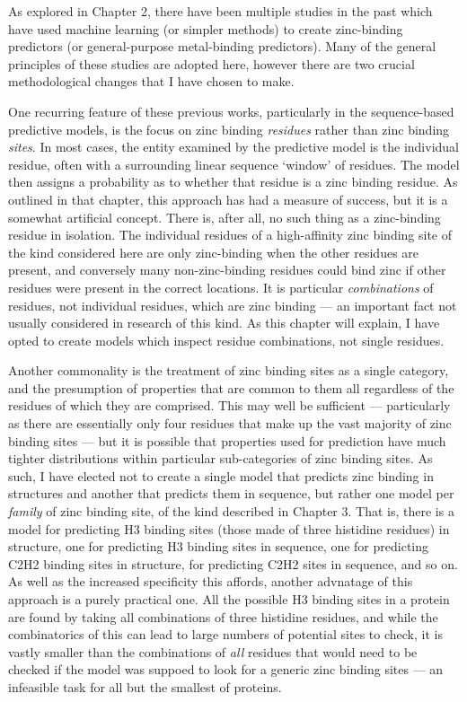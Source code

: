 As explored in Chapter 2, there have been multiple studies in the past which have used machine learning (or simpler methods) to create zinc-binding predictors (or general-purpose metal-binding predictors). Many of the general principles of these studies are adopted here, however there are two crucial methodological changes that I have chosen to make.

One recurring feature of these previous works, particularly in the sequence-based predictive models, is the focus on zinc binding \emph{residues} rather than zinc binding \emph{sites}. In most cases, the entity examined by the predictive model is the individual residue, often with a surrounding linear sequence `window' of residues. The model then assigns a probability as to whether that residue is a zinc binding residue. As outlined in that chapter, this approach has had a measure of success, but it is a somewhat artificial concept. There is, after all, no such thing as a zinc-binding residue in isolation. The individual residues of a high-affinity zinc binding site of the kind considered here are only zinc-binding when the other residues are present, and conversely many non-zinc-binding residues could bind zinc if other residues were present in the correct locations. It is particular \emph{combinations} of residues, not individual residues, which are zinc binding --- an important fact not usually considered in research of this kind. As this chapter will explain, I have opted to create models which inspect residue combinations, not single residues.

Another commonality is the treatment of zinc binding sites as a single category, and the presumption of properties that are common to them all regardless of the residues of which they are comprised. This may well be sufficient --- particularly as there are essentially only four residues that make up the vast majority of zinc binding sites --- but it is possible that properties used for prediction have much tighter distributions within particular sub-categories of zinc binding sites. As such, I have elected not to create a single model that predicts zinc binding in structures and another that predicts them in sequence, but rather one model per \emph{family} of zinc binding site, of the kind described in Chapter 3. That is, there is a model for predicting H3 binding sites (those made of three histidine residues) in structure, one for predicting H3 binding sites in sequence, one for predicting C2H2 binding sites in structure, for predicting C2H2 sites in sequence, and so on. As well as the increased specificity this affords, another advnatage of this approach is a purely practical one. All the possible H3 binding sites in a protein are found by taking all combinations of three histidine residues, and while the combinatorics of this can lead to large numbers of potential sites to check, it is vastly smaller than the combinations of \emph{all} residues that would need to be checked if the model was suppoed to look for a generic zinc binding sites --- an infeasible task for all but the smallest of proteins.

